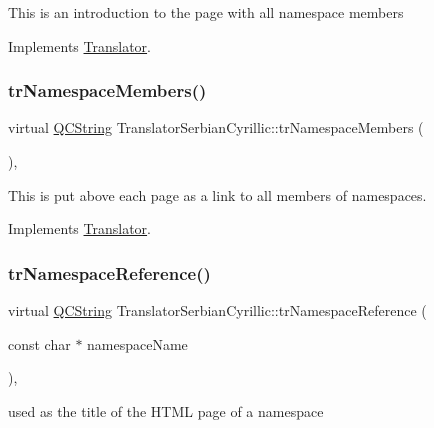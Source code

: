 This is an introduction to the page with all namespace members 

Implements \mbox{\hyperlink{class_translator}{Translator}}.

\mbox{\label{class_translator_serbian_cyrillic_aed41f07384469cb088f6c89ccb5822c5}} 
\subsubsection{\texorpdfstring{trNamespaceMembers()}{trNamespaceMembers()}}
{\footnotesize\ttfamily virtual \mbox{\hyperlink{class_q_c_string}{Q\+C\+String}} Translator\+Serbian\+Cyrillic\+::tr\+Namespace\+Members (\begin{DoxyParamCaption}{ }\end{DoxyParamCaption})\hspace{0.3cm}{\ttfamily [inline]}, {\ttfamily [virtual]}}

This is put above each page as a link to all members of namespaces. 

Implements \mbox{\hyperlink{class_translator}{Translator}}.

\mbox{\label{class_translator_serbian_cyrillic_aadf4c3fce77f99128f445a464855e81e}} 
\subsubsection{\texorpdfstring{trNamespaceReference()}{trNamespaceReference()}}
{\footnotesize\ttfamily virtual \mbox{\hyperlink{class_q_c_string}{Q\+C\+String}} Translator\+Serbian\+Cyrillic\+::tr\+Namespace\+Reference (\begin{DoxyParamCaption}\item[{const char $\ast$}]{namespace\+Name }\end{DoxyParamCaption})\hspace{0.3cm}{\ttfamily [inline]}, {\ttfamily [virtual]}}

used as the title of the H\+T\+ML page of a namespace 

